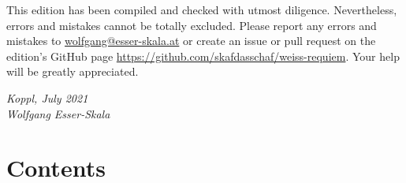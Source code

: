 \documentclass[parskip=full]{scrreprt}
\newif\iftemplate\templatetrue
\begin{document}
This edition has been compiled and checked with utmost diligence. Nevertheless, errors and mistakes cannot be totally excluded. Please report any errors and mistakes to \url{wolfgang@esser-skala.at} or create an issue or pull request on the edition’s GitHub page \url{https://github.com/skafdasschaf/weiss-requiem}. Your help will be greatly appreciated.

\bigskip
\textit{Koppl, July 2021\\
Wolfgang Esser-Skala}

\cleardoublepage
\chapter*{Contents}


\cleardoublepage
\fi

\iftemplate

\fi
\end{document}
